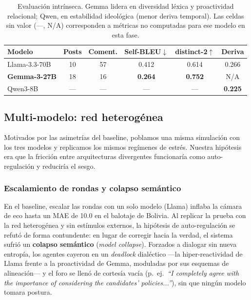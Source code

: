 \documentclass[11pt]{article}
\begin{document}
\begin{table}[t]
\centering
\small
\begin{tabular}{@{}lccccc@{}}
\toprule
\textbf{Modelo} & \textbf{Posts} & \textbf{Coment.} & \textbf{Self-BLEU}$\downarrow$ & \textbf{distinct-2}$\uparrow$ & \textbf{Deriva} \\
\midrule
Llama-3.3-70B & 10 & 57 & 0.412 & 0.614 & 0.266 \\
\textbf{Gemma-3-27B} & 18 & 16 & \textbf{0.264} & \textbf{0.752} & N/A \\
Qwen3-8B & --- & --- & --- & --- & \textbf{0.225} \\
\bottomrule
\end{tabular}
\caption{Evaluación intrínseca. Gemma lidera en diversidad léxica y proactividad relacional; Qwen, en estabilidad ideológica (menor deriva temporal). Las celdas sin valor (---, N/A) corresponden a métricas no computadas para ese modelo en esta fase.}
\label{tab:intrinseca}
\end{table}

\subsection{Multi-modelo: red heterogénea}
\label{subsec:multimodelo}

Motivados por las asimetrías del baseline, poblamos una misma simulación con los tres modelos y replicamos los mismos regímenes de estrés. Nuestra hipótesis era que la fricción entre arquitecturas divergentes funcionaría como auto-regulación y reduciría el sesgo.

\subsubsection{Escalamiento de rondas y colapso semántico}

En el baseline, escalar las rondas con un solo modelo (Llama) inflaba la cámara de eco hasta un MAE de 10.0 en el balotaje de Bolivia. Al replicar la prueba con la red heterogénea y sin estímulos externos, la hipótesis de auto-regulación se refutó de forma contundente: en lugar de corregir hacia la verdad, el sistema sufrió un \textbf{colapso semántico} (\textit{model collapse}). Forzados a dialogar sin nueva entropía, los agentes cayeron en un \textit{deadlock} dialéctico —la hiper-reactividad de Llama frente a la proactividad de Gemma, moduladas por sus esquemas de alineación— y el foro se llenó de cortesía vacía (p.\ ej.\ \textit{``I completely agree with the importance of considering the candidates' policies...''}), sin que ningún modelo tomara postura.
\end{document}
